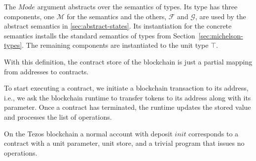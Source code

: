 The $Mode$ argument abstracts over the semantics of types. Its type
has three components, one $\mathcal{M}$ for the semantics and the others,
$\mathcal{F}$ and $\mathcal{G}$, are used by the abstract semantics in \autoref{sec:abstract-states}.
\ConcreteMODE
Its instantiation for the concrete semantics installs the 
standard semantics of types from Section~\ref{sec:michelson-types}. The
remaining components are instantiated to the unit type $\top$.
\ConcreteCMode

With this definition, the contract store of the blockchain is just a partial mapping from addresses
to contracts.
\ConcreteBlockchain

To start executing a contract, we initiate a blockchain transaction to its
address, i.e., we ask the blockchain runtime to transfer tokens to its
address along with its parameter.
Once a contract has terminated, the runtime updates the
stored value and processes the list of operations.

On the Tezos blockchain a normal account with deposit $init$
corresponds to a
contract with a unit parameter, unit store, and a trivial program that issues no operations.
\ConcreteAccount


